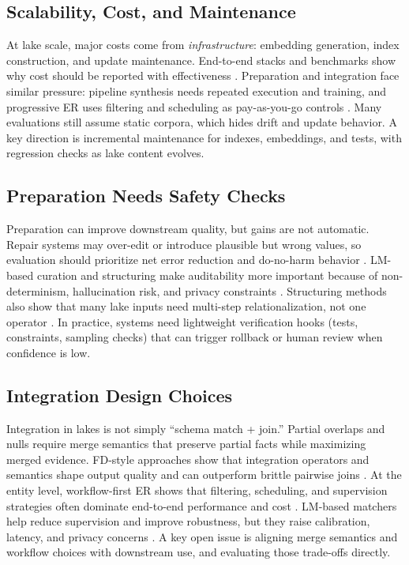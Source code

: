 \documentclass[sigconf,nonacm]{acmart}
\begin{document}
\subsection{Scalability, Cost, and Maintenance}
At lake scale, major costs come from \emph{infrastructure}: embedding generation, index construction, and update maintenance. End-to-end stacks and benchmarks show why cost should be reported with effectiveness \cite{10.14778/3685800.3685880,10.14778/3659437.3659448,10.14778/3750601.3750694}. Preparation and integration face similar pressure: pipeline synthesis needs repeated execution and training, and progressive ER uses filtering and scheduling as pay-as-you-go controls \cite{10.1145/3698831,10.1145/3709715,10184692}. Many evaluations still assume static corpora, which hides drift and update behavior. A key direction is incremental maintenance for indexes, embeddings, and tests, with regression checks as lake content evolves.

\subsection{Preparation Needs Safety Checks}
Preparation can improve downstream quality, but gains are not automatic. Repair systems may over-edit or introduce plausible but wrong values, so evaluation should prioritize net error reduction and do-no-harm behavior \cite{10.14778/3675034.3675051}. LM-based curation and structuring make auditability more important because of non-determinism, hallucination risk, and privacy constraints \cite{10.14778/3611540.3611624,10.14778/3574245.3574258}. Structuring methods also show that many lake inputs need multi-step relationalization, not one operator \cite{10.1145/3665252.3665269,10.14778/3626292.3626294,10.14778/3681954.3682019}. In practice, systems need lightweight verification hooks (tests, constraints, sampling checks) that can trigger rollback or human review when confidence is low.

\subsection{Integration Design Choices}
Integration in lakes is not simply ``schema match + join.'' Partial overlaps and nulls require merge semantics that preserve partial facts while maximizing merged evidence. FD-style approaches show that integration operators and semantics shape output quality and can outperform brittle pairwise joins \cite{10.14778/3574245.3574274,10.1145/3555041.3589732}. At the entity level, workflow-first ER shows that filtering, scheduling, and supervision strategies often dominate end-to-end performance and cost \cite{10.1145/3709715,10.1145/3588712,10.1145/3626711,10.1145/3588938}. LM-based matchers help reduce supervision and improve robustness, but they raise calibration, latency, and privacy concerns \cite{10.14778/3742728.3742757}. A key open issue is aligning merge semantics and workflow choices with downstream use, and evaluating those trade-offs directly.
\end{document}
